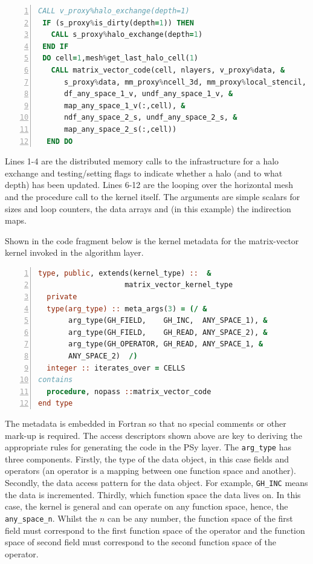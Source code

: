 \documentclass[review,times]{elsarticle}
\begin{document}
\begin{lstlisting}[language=Fortran, numbers=left,caption={Code 
fragment of the generated PSy layer with distributed memory support},label={lst:PSy1}]
 CALL v_proxy%halo_exchange(depth=1)
 IF (s_proxy%is_dirty(depth=1)) THEN
   CALL s_proxy%halo_exchange(depth=1)
 END IF 
 DO cell=1,mesh%get_last_halo_cell(1)
   CALL matrix_vector_code(cell, nlayers, v_proxy%data, &
      s_proxy%data, mm_proxy%ncell_3d, mm_proxy%local_stencil, &
      df_any_space_1_v, undf_any_space_1_v, &
      map_any_space_1_v(:,cell), &
      ndf_any_space_2_s, undf_any_space_2_s, &
      map_any_space_2_s(:,cell))
  END DO 
\end{lstlisting}
Lines 1-4 are the distributed
memory calls to the infrastructure for a halo exchange and
testing/setting flags to indicate whether a halo (and to what depth)
has been updated. Lines 6-12 are the looping over the horizontal mesh
and the procedure call to the kernel itself. The arguments are simple
scalars for sizes and loop counters, the data arrays and (in this example)
the indirection maps. 


Shown in the code fragment below is the kernel metadata for the
matrix-vector kernel invoked in the algorithm layer.
\begin{lstlisting}[language=Fortran, numbers=left,caption={Code
fragment showing kernel metadata for the matrix-vector operator kernel},label={lst:metadata}]
type, public, extends(kernel_type) ::  &
                    matrix_vector_kernel_type
  private
  type(arg_type) :: meta_args(3) = (/ &
       arg_type(GH_FIELD,    GH_INC,  ANY_SPACE_1), &
       arg_type(GH_FIELD,    GH_READ, ANY_SPACE_2), &
       arg_type(GH_OPERATOR, GH_READ, ANY_SPACE_1, &
       ANY_SPACE_2)  /)
  integer :: iterates_over = CELLS
contains
  procedure, nopass ::matrix_vector_code
end type
\end{lstlisting}
The metadata is embedded in Fortran so that no special comments or
other mark-up is required. The access descriptors shown above are key
to deriving the appropriate rules for generating the code in the PSy
layer. The \verb+arg_type+ has three components. Firstly, the type of
the data object, in this case fields and operators (an
operator is a mapping between one function space and another). Secondly,
the data access pattern for the data object. For example, \verb+GH_INC+ means the data is
incremented. Thirdly, which function space the data lives on. In this case, the
kernel is general and can operate on any function space, hence, the
\verb+any_space_n+. Whilst the $n$ can be any number, the function space of the
first field must correspond to the first function space of the operator and the
function space of second field must correspond to the second function
space of the operator. 
\end{document}
